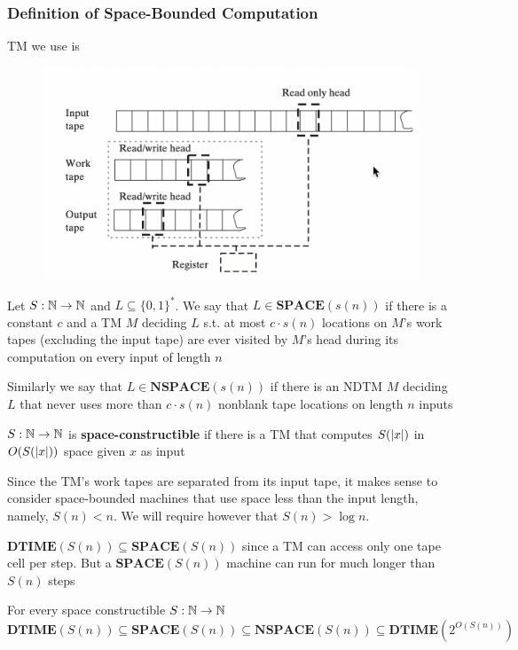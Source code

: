 \documentclass[11pt]{article}
\def \SPACE {\textbf{SPACE}}
\def \NSPACE {\textbf{NSPACE}}
\def \DTIME {\textbf{DTIME}}
\begin{document}
\subsubsection{Definition of Space-Bounded Computation}
\label{sec:org6e8504e}
TM we use is
\begin{figure}[htbp]
\centering
\includegraphics[width=.7\textwidth]{../images/ComputationalComplexity/9.png}
\label{}
\end{figure}

\begin{definition}
Let \(S:\mathbb{N}\to\mathbb{N}\) and \(L\subseteq\{0,1\}^*\). We say that \(L\in\SPACE(s(n))\) if there is a
constant \(c\) and a TM \(M\) deciding \(L\) s.t. at most \(c\cdot s(n)\) locations on \(M\)'s
work tapes (excluding the input tape) are ever visited by \(M\)'s head during its computation on
every input of length \(n\)

Similarly we say that \(L\in\NSPACE(s(n))\) if there is an NDTM \(M\) deciding \(L\) that never
uses more than \(c\cdot s(n)\) nonblank tape locations on length \(n\) inputs
\end{definition}



\(S:\mathbb{N}\to\mathbb{N}\) is \textbf{space-constructible} if there is a TM that computes \(S(\abs{x})\)
in \(O(S(\abs{x}))\) space given \(x\) as input

Since the TM's work tapes are separated from its input tape, it makes sense to consider
space-bounded machines that use space less than the input length, namely, \(S(n)<n\). We will
require however that \(S(n)>\log n\).

\(\DTIME(S(n))\subseteq\SPACE(S(n))\) since a TM can access only one tape cell per step. But
a \(\SPACE(S(n))\) machine can run for much longer than \(S(n)\) steps

\begin{theorem}[]
For every space constructible \(S:\mathbb{N}\to\mathbb{N}\)
\begin{equation*}
\DTIME(S(n))\subseteq\SPACE(S(n))\subseteq\NSPACE(S(n))\subseteq\DTIME(2^{O(S(n))})
\end{equation*}
\end{theorem}
\end{document}
